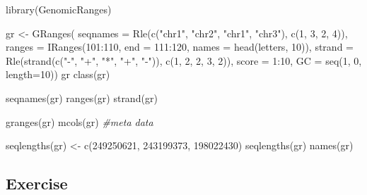 \documentclass[
]{book}
\newenvironment{Shaded}{\begin{snugshade}}{\end{snugshade}}
\newcommand{\AttributeTok}[1]{\textcolor[rgb]{0.77,0.63,0.00}{#1}}
\newcommand{\CommentTok}[1]{\textcolor[rgb]{0.56,0.35,0.01}{\textit{#1}}}
\newcommand{\DecValTok}[1]{\textcolor[rgb]{0.00,0.00,0.81}{#1}}
\newcommand{\FunctionTok}[1]{\textcolor[rgb]{0.00,0.00,0.00}{#1}}
\newcommand{\NormalTok}[1]{#1}
\newcommand{\OtherTok}[1]{\textcolor[rgb]{0.56,0.35,0.01}{#1}}
\newcommand{\SpecialCharTok}[1]{\textcolor[rgb]{0.00,0.00,0.00}{#1}}
\newcommand{\StringTok}[1]{\textcolor[rgb]{0.31,0.60,0.02}{#1}}
\begin{document}
\begin{Shaded}
\begin{Highlighting}[]
\FunctionTok{library}\NormalTok{(GenomicRanges)}

\NormalTok{gr }\OtherTok{\textless{}{-}} \FunctionTok{GRanges}\NormalTok{(}
    \AttributeTok{seqnames =} \FunctionTok{Rle}\NormalTok{(}\FunctionTok{c}\NormalTok{(}\StringTok{"chr1"}\NormalTok{, }\StringTok{"chr2"}\NormalTok{, }\StringTok{"chr1"}\NormalTok{, }\StringTok{"chr3"}\NormalTok{), }\FunctionTok{c}\NormalTok{(}\DecValTok{1}\NormalTok{, }\DecValTok{3}\NormalTok{, }\DecValTok{2}\NormalTok{, }\DecValTok{4}\NormalTok{)),}
    \AttributeTok{ranges =} \FunctionTok{IRanges}\NormalTok{(}\DecValTok{101}\SpecialCharTok{:}\DecValTok{110}\NormalTok{, }\AttributeTok{end =} \DecValTok{111}\SpecialCharTok{:}\DecValTok{120}\NormalTok{, }\AttributeTok{names =} \FunctionTok{head}\NormalTok{(letters, }\DecValTok{10}\NormalTok{)),}
    \AttributeTok{strand =} \FunctionTok{Rle}\NormalTok{(}\FunctionTok{strand}\NormalTok{(}\FunctionTok{c}\NormalTok{(}\StringTok{"{-}"}\NormalTok{, }\StringTok{"+"}\NormalTok{, }\StringTok{"*"}\NormalTok{, }\StringTok{"+"}\NormalTok{, }\StringTok{"{-}"}\NormalTok{)), }\FunctionTok{c}\NormalTok{(}\DecValTok{1}\NormalTok{, }\DecValTok{2}\NormalTok{, }\DecValTok{2}\NormalTok{, }\DecValTok{3}\NormalTok{, }\DecValTok{2}\NormalTok{)),}
    \AttributeTok{score =} \DecValTok{1}\SpecialCharTok{:}\DecValTok{10}\NormalTok{,}
    \AttributeTok{GC =} \FunctionTok{seq}\NormalTok{(}\DecValTok{1}\NormalTok{, }\DecValTok{0}\NormalTok{, }\AttributeTok{length=}\DecValTok{10}\NormalTok{))}
\NormalTok{gr}
\FunctionTok{class}\NormalTok{(gr)}

\FunctionTok{seqnames}\NormalTok{(gr)}
\FunctionTok{ranges}\NormalTok{(gr)}
\FunctionTok{strand}\NormalTok{(gr)}

\FunctionTok{granges}\NormalTok{(gr) }
\FunctionTok{mcols}\NormalTok{(gr) }\CommentTok{\#meta data}

\FunctionTok{seqlengths}\NormalTok{(gr) }\OtherTok{\textless{}{-}} \FunctionTok{c}\NormalTok{(}\DecValTok{249250621}\NormalTok{, }\DecValTok{243199373}\NormalTok{, }\DecValTok{198022430}\NormalTok{)}
\FunctionTok{seqlengths}\NormalTok{(gr)}
\FunctionTok{names}\NormalTok{(gr)}
\end{Highlighting}
\end{Shaded}

\hypertarget{exercise-9}{%
\subsection{Exercise}\label{exercise-9}}
\end{document}
